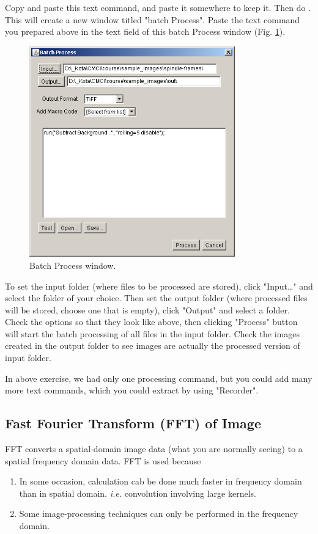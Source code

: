 \begin{indentexercise}{1}
Copy and paste this text command, and paste it somewhere to keep it.
Then do . This will create a new window titled
"batch Process". Paste the text
command you prepared above in the text field of this batch Process
window (Fig. \ref{fig:img74}). 

\begin{figure}[htbp]
\begin{center}
\includegraphics[width=8.881cm,height=9.116cm]{fig/CMCIBasicCourse201102-img74.png}
\caption{ Batch Process window.}
\label{fig:img74}
\end{center}
\end{figure}


To set the input folder (where files to be processed are stored), click
"Input\ldots" and select the
folder of your choice. Then set the output folder (where processed files will be
stored, choose one that is empty), click
"Output" and select a folder.
Check the options so that they look like above, then clicking
"Process" button will start the batch
processing of all files in the input folder. Check the images created
in the output folder to see images are actually the processed version
of input folder.
\end{indentexercise}

In above exercise, we had only one processing command, but you could add
many more text commands, which you could extract by using
"Recorder".
\subsection{Fast Fourier Transform (FFT) of Image}

FFT converts a spatial-domain image data (what you are normally seeing) to a spatial frequency domain data. FFT is used because 
\begin{enumerate}
\item In some occasion, calculation cab be done much faster in frequency domain
than in spatial domain. \textit{i.e.} convolution involving large kernels. 
\item Some image-processing techniques can only be performed in the frequency domain. 
\end{enumerate}

